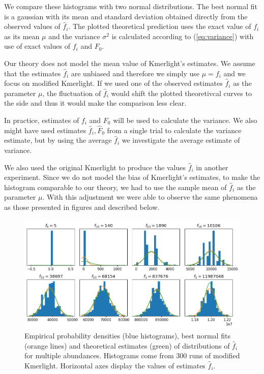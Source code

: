 We compare these histograms with two normal distributions. The best normal fit is a gaussian
with its mean and standard deviation obtained directly from the observed values of $\hat f_i$.
The plotted theoretical prediction uses the exact value of $f_i$ as its mean $\mu$ and
the variance $\sigma^2$ is calculated according to (\ref{eq:variance}) with use of exact values of 
$f_i$ and $F_0$. 

\medskip

Our theory does not model the mean value of Kmerlight's estimates. We assume that the estimates
$\hat f_i$ are unbiased and therefore we simply use $\mu = f_i$ and we focus on modified
Kmerlight. If we used one of the observed estimates $\hat f_i$ as the parameter $\mu$, the
fluctuation of $\hat f_i$ would shift the plotted theoretivcal curves to the side and thus it 
would make the comparison less clear. 

In practice, estimates of $f_i$ and $F_0$ will be used to calculate the variance. We also might
have used estimates $\hat f_i, \hat F_0$ from a single trial to calculate the variance estimate, 
but by using the average $\hat f_i$ we investigate the average estimate of variance.   

We also used the original Kmerlight to produce the values $\hat f_i$ in another experiment.
Since we do not model the bias of Kmerlight's estimates, to make the histogram comparable
to our theory, we had to use the sample mean of $\hat f_i$ as the parameter $\mu$.
With this adjustment we were able to observe the same phenomena as those presented in figures and 
described below.


\begin{figure}[h]
\centerline{\includegraphics[width=1\textwidth, trim={0cm, 0.1cm, 0cm, 0cm}, clip]{images/pdf2.png}}
\caption[Density functions of $\hat f_i$]{Empirical probability densities (blue histograms), best
normal fits (orange lines) and theoretical estimates (green) of distributions of $\hat f_i$
for multiple abundances. Histograms come from 300 runs of modified Kmerlight.
Horizontal axes display the values of estimates $\hat f_i$.}
\label{img:estimated-pdf}
\end{figure}

